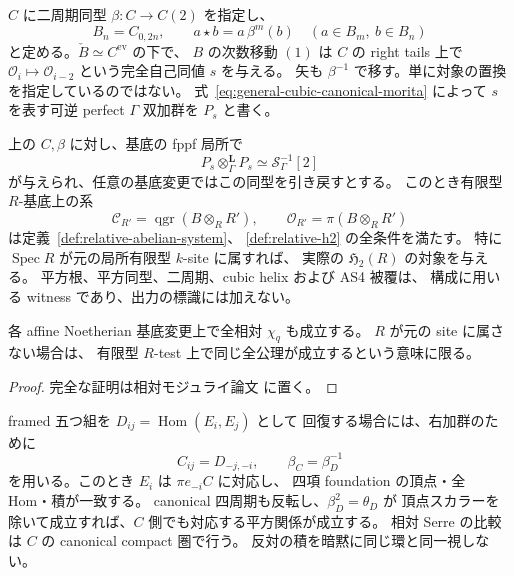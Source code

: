 $C$ に二周期同型 $\beta:C\to C(2)$ を指定し、
\[
 B_n=C_{0,2n},\qquad a\star b=a\,\beta^m(b)
 \quad(a\in B_m,\ b\in B_n)
 \tag{GC-prod}\label{eq:general-cubic-period-product}
\]
と定める。$\check B\simeq C^{\mathrm{ev}}$ の下で、
$B$ の次数移動 $(1)$ は $C$ の right tails 上で
$\mathcal O_i\mapsto\mathcal O_{i-2}$ という完全自己同値 $s$ を与える。
矢も $\beta^{-1}$ で移す。単に対象の置換を指定しているのではない。
式~\eqref{eq:general-cubic-canonical-morita} によって
$s$ を表す可逆 perfect $\Gamma$ 双加群を $P_s$ と書く。

\begin{theorem}
\label{thm:geometric-cubic-relative-effectivity}
上の $C,\beta$ に対し、基底の fppf 局所で
\[
 P_s\otimes_\Gamma^{\mathbf L}P_s
       \simeq\mathcal S_\Gamma^{-1}[2]
 \tag{GC-root}\label{eq:general-cubic-serre-input}
\]
が与えられ、任意の基底変更ではこの同型を引き戻すとする。
このとき有限型 $R$-基底上の系
\[
 \mathcal C_{R'}=\operatorname{qgr}(B\otimes_RR'),\qquad
 \mathcal O_{R'}=\pi(B\otimes_RR')
 \tag{GC-family}\label{eq:general-cubic-relative-family}
\]
は定義~\ref{def:relative-abelian-system}、
\ref{def:relative-h2} の全条件を満たす。
特に $\operatorname{Spec}R$ が元の局所有限型 $k$-site に属すれば、
実際の $\mathfrak H_2(R)$ の対象を与える。
平方根、平方同型、二周期、cubic helix および AS4 被覆は、
構成に用いる witness であり、出力の標識には加えない。

各 affine Noetherian 基底変更上で全相対 $\chi_q$ も成立する。
$R$ が元の site に属さない場合は、
有限型 $R$-test 上で同じ全公理が成立するという意味に限る。
\end{theorem}

\begin{proof}
完全な証明は相対モジュライ論文 \cite[\texttt{relative_cubic_families}]{QuadricModuli2026} に置く。
\end{proof}

\begin{remark}
\label{rem:general-cubic-right-orientation}
framed 五つ組を $D_{ij}=\operatorname{Hom}(E_i,E_j)$ として
回復する場合には、右加群のために
\[
 C_{ij}=D_{-j,-i},\qquad \beta_C=\beta_D^{-1}
\]
を用いる。このとき $E_i$ は $\pi e_{-i}C$ に対応し、
四項 foundation の頂点・全 Hom・積が一致する。
canonical 四周期も反転し、$\beta_D^2=\theta_D$ が
頂点スカラーを除いて成立すれば、$C$ 側でも対応する平方関係が成立する。
相対 Serre の比較は $C$ の canonical compact 圏で行う。
反対の積を暗黙に同じ環と同一視しない。
\end{remark}
